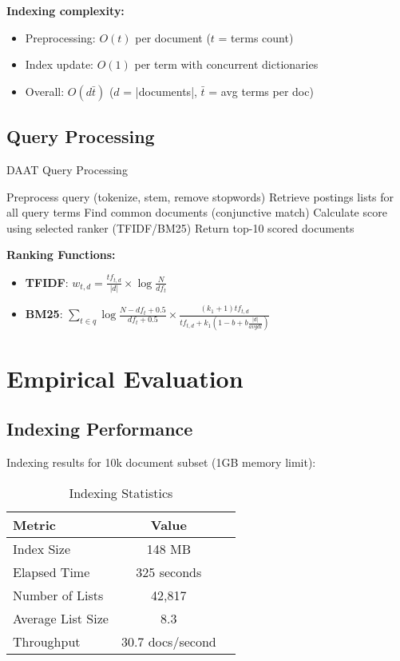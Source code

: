 \textbf{Indexing complexity:}

\begin{itemize}
  \item Preprocessing: $O(t)$ per document ($t$ = terms count)
  \item Index update: $O(1)$ per term with concurrent dictionaries
  \item Overall: $O(d \bar{t})$ ($d$ = |documents|, $\bar{t}$ = avg terms per doc)
\end{itemize}

\subsection{Query Processing}
\begin{algorithm}[H]
  \caption{DAAT Query Processing}
  \begin{algorithmic}
    \STATE Preprocess query (tokenize, stem, remove stopwords)
    \STATE Retrieve postings lists for all query terms
    \STATE Find common documents (conjunctive match)
    \STATE Calculate score using selected ranker (TFIDF/BM25)
    \ENDFOR
    \STATE Return top-10 scored documents
  \end{algorithmic}
\end{algorithm}

\textbf{Ranking Functions:}
\begin{itemize}
  \item \textbf{TFIDF}: $w_{t,d} = \frac{tf_{t,d}}{|d|} \times \log\frac{N}{df_t}$
  \item \textbf{BM25}: $\sum_{t \in q} \log\frac{N-df_t+0.5}{df_t+0.5} \times \frac{(k_1+1)tf_{t,d}}{tf_{t,d} + k_1(1-b+b\frac{|d|}{avgdl})}$
\end{itemize}

\section{Empirical Evaluation}

\subsection{Indexing Performance}
Indexing results for 10k document subset (1GB memory limit):

\begin{table}[htbp]
  \caption{Indexing Statistics}
  \label{tab:index-stats}
  \begin{tabular}{lcc}
    \toprule
    \textbf{Metric}   & \textbf{Value}   \\
    \midrule
    Index Size        & 148 MB           \\
    Elapsed Time      & 325 seconds      \\
    Number of Lists   & 42,817           \\
    Average List Size & 8.3              \\
    Throughput        & 30.7 docs/second \\
    \bottomrule
  \end{tabular}
\end{table}

